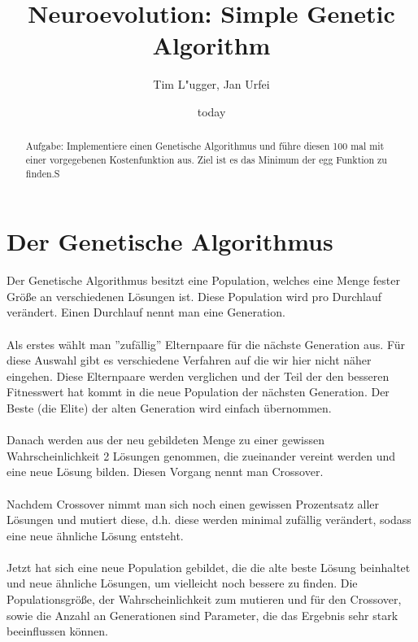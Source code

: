 \documentclass{hbrs-ecta-report}
\begin{document}

\title{Neuroevolution: Simple Genetic Algorithm}
\subtitle{}

\author{
\alignauthor
Tim L"ugger, Jan Urfei
}

\date{today}
\maketitle
\begin{abstract}
Aufgabe: Implementiere einen Genetische Algorithmus und führe diesen 100 mal mit einer vorgegebenen Kostenfunktion aus. Ziel ist es das Minimum der egg Funktion zu finden.S	
\end{abstract}

\section{Der Genetische Algorithmus}
Der Genetische Algorithmus besitzt eine Population, welches eine Menge fester Größe an verschiedenen Lösungen ist. Diese Population wird pro Durchlauf verändert. Einen Durchlauf nennt man eine Generation. 
\\ 
\\
Als erstes wählt man ''zufällig'' Elternpaare für die nächste Generation aus. Für diese Auswahl gibt es verschiedene Verfahren auf die wir hier nicht näher eingehen. Diese Elternpaare werden verglichen und der Teil der den besseren Fitnesswert hat kommt in die neue Population der nächsten Generation. Der Beste (die Elite) der alten Generation wird einfach übernommen.
\\ 
\\
Danach werden aus der neu gebildeten Menge zu einer gewissen Wahrscheinlichkeit  2 Lösungen genommen, die zueinander vereint werden und eine neue Lösung bilden. Diesen Vorgang nennt man Crossover.
\\
\\
Nachdem Crossover nimmt man sich noch einen gewissen Prozentsatz aller Lösungen und mutiert diese, d.h. diese werden minimal zufällig verändert, sodass eine neue ähnliche Lösung entsteht.
\\
\\ 
Jetzt  hat sich eine neue Population gebildet, die die alte beste Lösung beinhaltet und neue ähnliche Lösungen, um vielleicht noch bessere zu finden. Die Populationsgröße, der Wahrscheinlichkeit zum mutieren und für den Crossover, sowie die Anzahl an Generationen sind Parameter, die das Ergebnis sehr stark beeinflussen können.
\end{document}
